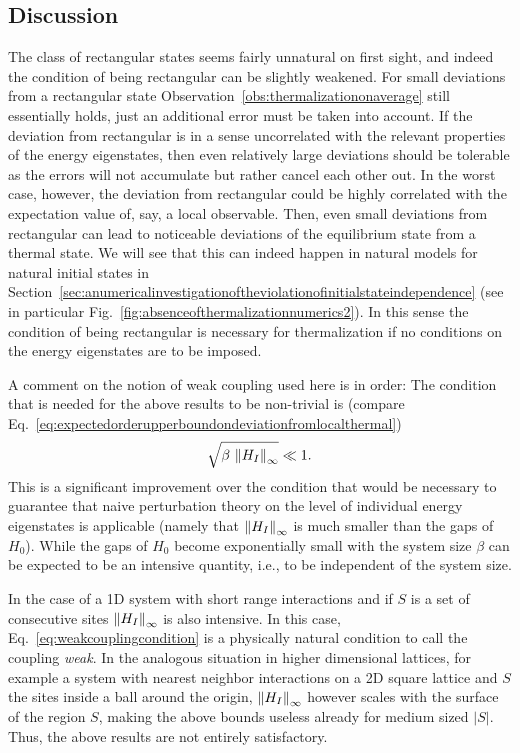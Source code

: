 \documentclass[a4paper,12pt,listof=totoc,index=totoc,bibliography=totoc,headsepline=false,headings=normal,BCOR16.153846mm,DIV12,headinclude,twoside,cleardoublepage=empty,numbers=noenddot,final]{scrreprt}
\theoremstyle{mystyle}
\numberwithin{equation}{section}
\numberwithin{figure}{section}
\numberwithin{lemma}{section}
\numberwithin{theorem}{section}
\numberwithin{corollary}{section}
\numberwithin{definition}{section}
\numberwithin{conjecture}{section}
\numberwithin{observation}{section}
\newcommand{\+}{\mkern2mu}
\newcommand{\texteqref}[1]{Eq.~\eqref{#1}}
\renewcommand{\H}{H}
\newcommand{\norm}[2][]{
  \ifthenelse{\equal{#1}{}}
    {\left\| {#2} \right\|}
    {\ifthenelse{\equal{#1}{uinv}}
      {\left\vert\kern-0.25ex\left\vert\kern-0.25ex\left\vert {#2} \right\vert\kern-0.25ex\right\vert\kern-0.25ex\right\vert}
      {\left\| {#2} \right\|_{#1}}
    }
}
\DeclareMathOperator{\1}{\mathds{1}}
\begin{document}
\subsection*{Discussion}
%
The class of rectangular states seems fairly unnatural on first sight, and indeed the condition of being rectangular can be slightly weakened.
For small deviations from a rectangular state Observation~\ref{obs:thermalizationonaverage} still essentially holds, just an additional error must be taken into account.
If the deviation from rectangular is in a sense uncorrelated with the relevant properties of the energy eigenstates, then even relatively large deviations should be tolerable as the errors will not accumulate but rather cancel each other out.
In the worst case, however, the deviation from rectangular could be highly correlated with the expectation value of, say, a local observable.
Then, even small deviations from rectangular can lead to noticeable deviations of the equilibrium state from a thermal state.
We will see that this can indeed happen in natural models for natural initial states in Section~\ref{sec:anumericalinvestigationoftheviolationofinitialstateindependence} (see in particular Fig.~\ref{fig:absenceofthermalizationnumerics2}).
In this sense the condition of being rectangular is necessary for thermalization if no conditions on the energy eigenstates are to be imposed.

A comment on the notion of weak coupling used here is in order:
The condition that is needed for the above results to be non-trivial is (compare \texteqref{eq:expectedorderupperboundondeviationfromlocalthermal})
\begin{equation} \label{eq:weakcouplingcondition}
  \sqrt{\beta\,\norm[\infty]{H_I}} \ll 1 .
\end{equation}
This is a significant improvement over the condition that would be necessary to guarantee that naive perturbation theory on the level of individual energy eigenstates is applicable (namely that $\norm[\infty]{H_I}$ is much smaller than the gaps of $\H_0$).
While the gaps of $\H_0$ become exponentially small with the system size $\beta$ can be expected to be an intensive quantity, i.e., to be independent of the system size.

In the case of a 1D system with short range interactions and if $S$ is a set of consecutive sites $\norm[\infty]{H_I}$ is also intensive.
In this case, \texteqref{eq:weakcouplingcondition} is a physically natural condition to call the coupling \emph{weak}. 
In the analogous situation in higher dimensional lattices, for example a system with nearest neighbor interactions on a 2D square lattice and $S$ the sites inside a ball around the origin, $\norm[\infty]{H_I}$ however scales with the surface of the region $S$, making the above bounds useless already for medium sized $|S|$.
Thus, the above results are not entirely satisfactory.
\end{document}
